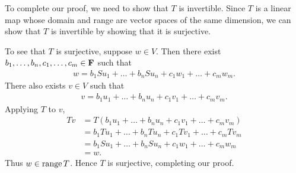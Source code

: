 \documentclass[a5paper]{article}
\begin{document}
    To complete our proof, we need to show that $T$ is invertible.
    Since $T$ is a linear map whose domain and range are vector spaces of the same dimension, we can show that $T$ is invertible by showing that it is surjective.

    To see that $T$ is surjective, suppose $w \in V$.
    Then there exist $b_1,\dots,b_n,c_1,\dots,c_m \in \mathbf{F}$ such that
\begin{align*}
        w = b_1 Su_1 + \dots + b_n Su_n + c_1 w_1 + \dots + c_m w_m .
\end{align*}
    There also exists $v \in V$ such that
\begin{align*}
        v = b_1 u_1 + \dots + b_n u_n + c_1 v_1 + \dots + c_m v_m .
\end{align*}
    Applying $T$ to $v$,
\begin{align*}
        Tv &= T (b_1u_1 + \dots + b_nu_n + c_1v_1 + \dots + c_mv_m) \\
           &= b_1 Tu_1 + \dots + b_n Tu_n + c_1 Tv_1 + \dots + c_m Tv_m \\
           &= b_1 Su_1 + \dots + b_n Su_n + c_1 w_1 + \dots + c_m w_m \\
           &= w .
\end{align*}
    Thus $w \in \operatorname{range}T$.
    Hence $T$ is surjective, completing our proof.
\end{document}
